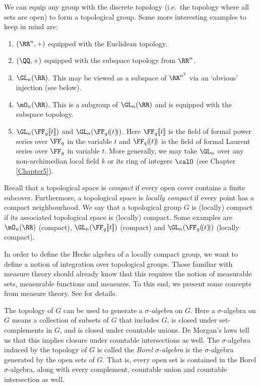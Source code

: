 \documentclass[11pt]{amsart}
\theoremstyle{remark}
\begin{document}
We can equip any group with the discrete topology (i.e.\ the topology where all sets are open) to form a topological group.
Some more interesting examples to keep in mind are:
\begin{enumerate}[\itshape(i)]
	\item $(\RR^n,+)$ equipped with the Euclidean topology.
	\item $(\QQ,+)$ equipped with the subspace topology from $\RR^n$.
	\item $\GL_n(\RR)$.
	      This may be viewed as a subspace of $\RR^{n^2}$ via an `obvious' injection (see below).
	\item $\mO_n(\RR)$.
	      This is a subgroup of $\GL_n(\RR)$ and is equipped with the subspace topology.
	\item $\GL_n(\FF_q[\![t]\!])$ and $\GL_n(\FF_q(\!(t)\!))$.
	      Here $\FF_q[\![t]\!]$ is the field of formal power series over $\FF_q$ in the variable $t$ and $\FF_q(\!(t)\!)$ is the field of formal Laurent series over $\FF_q$ in variable $t$.
	      More generally, we may take $\GL_n$ over any non-archimedian local field $k$ or its ring of integers $\calO$ (see Chapter \ref{Chapter5}).
\end{enumerate}
Recall that a topological space is \emph{compact} if every open cover contains a finite subcover.
Furthermore, a topological space is \emph{locally compact} if every point has a compact neighbourhood.
We say that a topological group $G$ is (locally) compact if its associated topological space is (locally) compact.
Some examples are $\mO_n(\RR)$ (compact), $\GL_n(\FF_q[\![t]\!])$ (compact) and $\GL_n(\FF_q(\!(t)\!))$ (locally compact).

In order to define the Hecke algebra of a locally compact group, we want to define a notion of integration over topological groups.
Those familiar with measure theory should already know that this requires the notion of measurable sets, measurable functions and measures.
To this end, we present some concepts from measure theory.
See \cite{Folland84} for details.

The topology of $G$ can be used to generate a \emph{$\sigma$-algebra} on $G$.
Here a $\sigma$-algebra on $G$ means a collection of subsets of $G$ that includes $G$, is closed under set-complements in $G$, and is closed under countable unions.
De Morgan's laws tell us that this implies closure under countable intersections as well.
The $\sigma$-algebra induced by the topology of $G$ is called the \emph{Borel $\sigma$-algebra} is the $\sigma$-algebra generated by the open sets of $G$.
That is, every open set is contained in the Borel $\sigma$-algebra, along with every complement, countable union and countable intersection as well.
\end{document}
